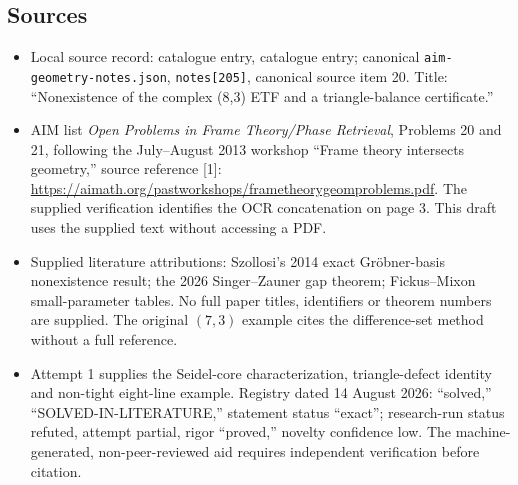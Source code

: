 \documentclass[11pt]{article}
\begin{document}
\subsection{Sources}
\begin{itemize}
\item Local source record: catalogue entry, catalogue entry; canonical \texttt{aim-geometry-notes.json}, \texttt{notes[205]}, canonical source item 20. Title: ``Nonexistence of the complex (8,3) ETF and a triangle-balance certificate.''
\item AIM list \emph{Open Problems in Frame Theory/Phase Retrieval}, Problems 20 and 21, following the July--August 2013 workshop ``Frame theory intersects geometry,'' source reference [1]: \url{https://aimath.org/pastworkshops/frametheorygeomproblems.pdf}. The supplied verification identifies the OCR concatenation on page 3. This draft uses the supplied text without accessing a PDF.
\item Supplied literature attributions: Szollosi's 2014 exact Gr\"obner-basis nonexistence result; the 2026 Singer--Zauner gap theorem; Fickus--Mixon small-parameter tables. No full paper titles, identifiers or theorem numbers are supplied. The original \((7,3)\) example cites the difference-set method without a full reference.
\item Attempt 1 supplies the Seidel-core characterization, triangle-defect identity and non-tight eight-line example. Registry dated 14 August 2026: ``solved,'' ``SOLVED-IN-LITERATURE,'' statement status ``exact''; research-run status refuted, attempt partial, rigor ``proved,'' novelty confidence low. The machine-generated, non-peer-reviewed aid requires independent verification before citation.
\end{itemize}
\end{document}
